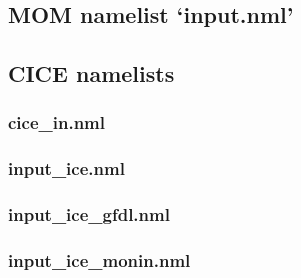\documentclass[11pt]{article}
\newcommand{\nmllink}[2]{#1} %
\newcommand{\nml}[1]{{\footnotesize\textsf{}}}
\begin{document}
\subsection{MOM namelist `input.nml'}\label{S:mom-namelist-diff}
\renewcommand{\nmllink}[2]{\href{https://github.com/mom-ocean/MOM5/search?q=#2}{#1}} %
\nml{input_nml_025deg_jra55v13_iaf_gmredi_diff.tex}
\nml{input_nml_1deg_jra55v13_iaf_spinup1_A_diff.tex}
\nml{input_nml_01deg_jra55v13_iaf_diff.tex}

\subsection{CICE namelists}\label{S:cice-namelist-diff}
\renewcommand{\nmllink}[2]{\href{https://github.com/OceansAus/cice5/search?q=#2}{#1}} %
\subsubsection{cice\_in.nml}
\nml{cice_in_nml_1deg_jra55v13_iaf_spinup1_A_diff.tex}
\nml{cice_in_nml_025deg_jra55v13_iaf_gmredi_diff.tex}
\nml{cice_in_nml_01deg_jra55v13_iaf_diff.tex}
\subsubsection{input\_ice.nml}
\nml{input_ice_nml_01deg_jra55v13_iaf_diff.tex}
\nml{input_ice_nml_025deg_jra55v13_iaf_gmredi_diff.tex}
\nml{input_ice_nml_1deg_jra55v13_iaf_spinup1_A_diff.tex}
\subsubsection{input\_ice\_gfdl.nml}
\nml{input_ice_gfdl_nml_01deg_jra55v13_iaf_diff.tex}
\nml{input_ice_gfdl_nml_025deg_jra55v13_iaf_gmredi_diff.tex}
\nml{input_ice_gfdl_nml_1deg_jra55v13_iaf_spinup1_A_diff.tex}
\subsubsection{input\_ice\_monin.nml}
\nml{input_ice_monin_nml_01deg_jra55v13_iaf_diff.tex}
\nml{input_ice_monin_nml_025deg_jra55v13_iaf_gmredi_diff.tex}
\nml{input_ice_monin_nml_1deg_jra55v13_iaf_spinup1_A_diff.tex}
\end{document}
